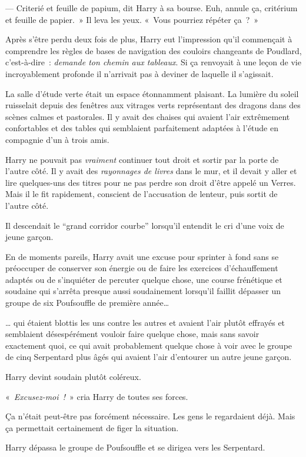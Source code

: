 --- Criterié et feuille de papium, dit Harry à sa bourse. Euh, annule ça, critérium et feuille de papier.~» Il leva les yeux. «~Vous pourriez répéter ça~?~»

Après s'être perdu deux fois de plus, Harry eut l'impression qu'il commençait à comprendre les règles de bases de navigation des couloirs changeants de Poudlard, c'est-à-dire~: \emph{demande ton chemin aux tableaux}. Si ça renvoyait à une leçon de vie incroyablement profonde il n'arrivait pas à deviner de laquelle il s'agissait.

La salle d'étude verte était un espace étonnamment plaisant. La lumière du soleil ruisselait depuis des fenêtres aux vitrages verts représentant des dragons dans des scènes calmes et pastorales. Il y avait des chaises qui avaient l'air extrêmement confortables et des tables qui semblaient parfaitement adaptées à l'étude en compagnie d'un à trois amis.

Harry ne pouvait pas \emph{vraiment} continuer tout droit et sortir par la porte de l'autre côté. Il y avait des \emph{rayonnages de livres} dans le mur, et il devait y aller et lire quelques-uns des titres pour ne pas perdre son droit d'être appelé un Verres. Mais il le fit rapidement, conscient de l'accusation de lenteur, puis sortit de l'autre côté.

Il descendait le “grand corridor courbe” lorsqu'il entendit le cri d'une voix de jeune garçon.

En de moments pareils, Harry avait une excuse pour sprinter à fond sans se préoccuper de conserver son énergie ou de faire les exercices d'échauffement adaptés ou de s'inquiéter de percuter quelque chose, une course frénétique et soudaine qui s'arrêta presque aussi soudainement lorsqu'il faillit dépasser un groupe de six Poufsouffle de première année…

… qui étaient blottis les uns contre les autres et avaient l'air plutôt effrayés et semblaient désespérément vouloir faire quelque chose, mais sans savoir exactement quoi, ce qui avait probablement quelque chose à voir avec le groupe de cinq Serpentard plus âgés qui avaient l'air d'entourer un autre jeune garçon.

Harry devint soudain plutôt coléreux.

«~\emph{Excusez-moi~!}~» cria Harry de toutes ses forces.

Ça n'était peut-être pas forcément nécessaire. Les gens le regardaient déjà. Mais ça permettait certainement de figer la situation.

Harry dépassa le groupe de Poufsouffle et se dirigea vers les Serpentard.

